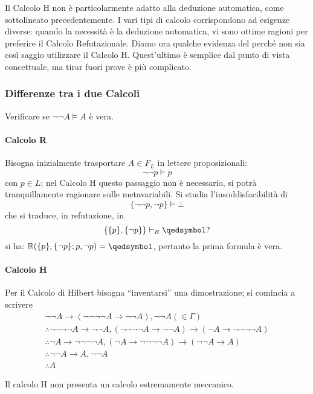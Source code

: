 Il Calcolo H non è particolarmente adatto alla deduzione automatica, come 
sottolineato precedentemente. I vari tipi di calcolo corrispondono ad esigenze 
diverse: quando la necessità è la deduzione automatica, vi sono ottime 
ragioni per preferire il Calcolo Refutazionale. Diamo ora qualche evidenza 
del perché non sia così saggio utilizzare il Calcolo H. Quest'ultimo è 
semplice dal punto di vista concettuale, ma tirar fuori prove è più complicato. 

\subsubsection{Differenze tra i due Calcoli}
Verificare se  $\neg \neg A \models A$ è vera. 

\paragraph{Calcolo R}
Bisogna inizialmente trasportare $A \in F_L$ in lettere proposizionali: 
$$
\neg \neg p \models p 
$$
con $p \in L$; nel Calcolo H questo passaggio non è necessario, si potrà 
tranquillamente ragionare sulle metavariabili.
Si studia l'insoddisfacibilità di 
$$
\{ \neg \neg p, \neg p\} \models \bot
$$
che si traduce, in refutazione, in 
$$
\{\{p\}, \{\neg p \}\} \vdash_R \qedsymbol ?
$$
si ha: $\mathbb{R}(\{p\}, \{\neg p\}; p, \neg p) =  \qedsymbol$, pertanto la prima 
formula è vera. 

\paragraph{Calcolo H}
Per il Calcolo di Hilbert bisogna ``inventarsi'' una dimostrazione; si 
comincia a scrivere 
\begin{align*}
\neg \neg A \rightarrow (\neg \neg \neg \neg A \rightarrow \neg \neg A), \neg \neg A ( \in \Gamma)\\
\therefore \neg \neg \neg \neg A \rightarrow \neg \neg A, ( \neg \neg \neg \neg A \rightarrow \neg \neg A) \rightarrow (\neg A \rightarrow \neg \neg \neg \neg A)\\
\therefore \neg A \rightarrow \neg \neg \neg \neg A, (\neg A \rightarrow \neg \neg \neg \neg A) \rightarrow ( \neg \neg A \rightarrow A) \\
\therefore  \neg \neg A \rightarrow A, \neg \neg A \\
\therefore A
\end{align*}

Il calcolo H non presenta un calcolo estremamente meccanico. 
